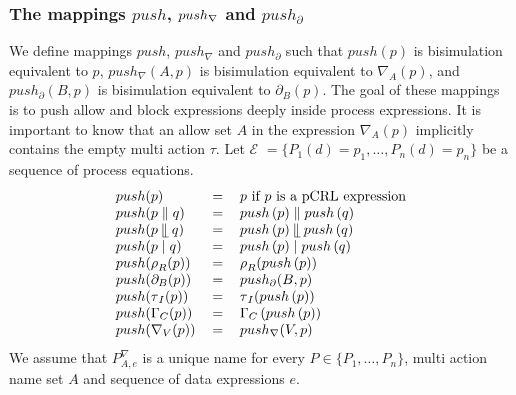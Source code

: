 \documentclass{article}
\providecommand{\leftmerge}{\mathbin{\mathrel{\llfloor}}}
\begin{document}
\subsubsection{The mappings $push$, $push_{\protect\nabla }$ and $%
push_{\partial }$}

We define mappings $push$, $push_{\nabla }$ and $push_{\partial }$ such that 
$push(p)$ is bisimulation equivalent to $p$, $push_{\nabla }(A,p)$ is
bisimulation equivalent to $\nabla _{A}(p)$, and $push_{\partial }(B,p)$ is
bisimulation equivalent to $\partial _{B}(p)$. The goal of these mappings is
to push allow and block expressions deeply inside process expressions. It is
important to know that an allow set $A$ in the expression $\nabla _{A}(p)$
implicitly contains the empty multi action $\tau $. Let $\mathcal{E}$ $%
=\{P_{1}(d)=p_{1},\ldots ,P_{n}(d)=p_{n}\}$ be a sequence of process
equations.%
\[
\begin{tabular}{lll}
$push(p)$ & $=$ & $p$ if $p$ is a pCRL expression \\ 
$push(p\parallel q)$ & $=$ & $push\left( p\right) \parallel push\left(
q\right) $ \\ 
$push(p\leftmerge q)$ & $=$ & $push\left( p\right) \leftmerge push\left(
q\right) $ \\ 
$push(p\mid q)$ & $=$ & $push\left( p\right) \mid push\left( q\right) $ \\ 
$push(\rho _{R}(p))$ & $=$ & $\rho _{R}(push\left( p\right) )$ \\ 
$push(\partial _{B}(p))$ & $=$ & $push_{\partial }(B,p)$ \\ 
$push(\tau _{I}(p))$ & $=$ & $\tau _{I}(push\left( p\right) )$ \\ 
$push(\Gamma _{C}(p))$ & $=$ & $\Gamma _{C}\left( push\left( p\right)
\right) $ \\ 
$push(\nabla _{V}(p))$ & $=$ & $push_{\nabla }(V,p)$%
\end{tabular}%
\]%
We assume that $P_{A,e}^{\nabla }$ is a unique name for every $P\in
\{P_{1},\ldots ,P_{n}\}$, multi action name set $A$ and sequence of data
expressions $e$.%
\end{document}
